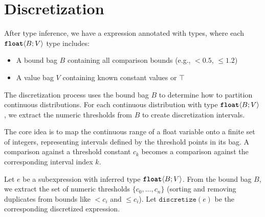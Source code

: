 \documentclass[acmsmall,screen,dvipsnames,x11names,nonacm,anonymous,review]{acmart}
\begin{document}
\section{Discretization}\label{sec:discretization}

After type inference, we have a \Slice{} expression annotated with types, where each $\text{\ttfamily\bfseries float}\langle B; V \rangle$ type includes:
\begin{itemize}
    \item A bound bag $B$ containing all comparison bounds (e.g., $<0.5$, $\leq 1.2$)
    \item A value bag $V$ containing known constant values or $\top$
\end{itemize}

The discretization process uses the bound bag $B$ to determine how to partition continuous distributions. For each continuous distribution with type $\text{\ttfamily\bfseries float}\langle B; V \rangle$, we extract the numeric thresholds from $B$ to create discretization intervals.

The core idea is to map the continuous range of a float variable onto a finite set of integers, representing intervals defined by the threshold points in its bag. A comparison against a threshold constant $c_k$ becomes a comparison against the corresponding interval index $k$.

Let $e$ be a subexpression with inferred type $\text{\ttfamily\bfseries float}\langle B; V \rangle$. From the bound bag $B$, we extract the set of numeric thresholds $\{c_0, \dots, c_n\}$ (sorting and removing duplicates from bounds like $<c_i$ and $\leq c_i$). Let $\texttt{discretize}(e)$ be the corresponding discretized expression.
\end{document}
